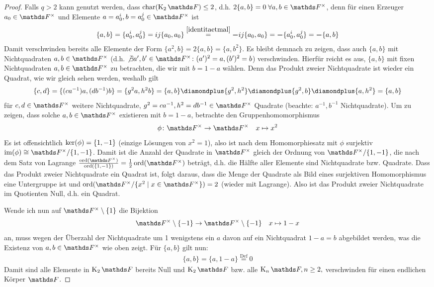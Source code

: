 \documentclass[ngerman,fontsize=11pt, paper=a4, parskip=half, titlepage=true, toc=bib]{scrartcl}
\begin{document}
\begin{Lem}
\begin{proof}
    Falls $q>2$ kann genutzt werden, dass $\Char(\K_2\F)\leq 2$, 
    d.h. $2\{a,b\}=0\;\forall a,b\in\Fx$,
    denn für einen Erzeuger $a_0\in\Fx$ und
    Elemente $a=a_0^i,b=a_0^j\in \Fx$ ist
    \begin{gather*}
      \{a,b\} = \{a_0^i,a_0^j\} = ij\{a_0,a_0\} 
      \overset{\ref{identitaetmal}}{=} \boldsymbol - ij\{a_0,a_0\}
      = \boldsymbol - \{a_0^i,a_0^j\} = \boldsymbol -\{a,b\} 
    \end{gather*}
    Damit verschwinden bereits alle Elemente der Form 
    $\{a^2,b\}=2\{a,b\}=\{a,b^2\}$. Es bleibt demnach zu zeigen, dass
    auch $\{a,b\}$ mit Nichtquadraten $a,b\in\Fx$
    (d.h. $\not\exists a',b'\in\Fx\colon (a')^2=a,(b')^2=b$)
    verschwinden.
    Hierfür reicht es aus, $\{a,b\}$ mit fixen Nichtquadraten
    $a,b\in\Fx$ zu betrachten, die wir mit $b=1-a$ wählen.
    Denn das Produkt zweier Nichtquadrate ist wieder ein Quadrat,
    wie wir gleich sehen werden, weshalb gilt
    \begin{gather*}
      \{c,d\}=\{(ca^{-1})a,(db^{-1})b\}=\{g^2a,h^2b\}
      =\{a,b\}\p\{g^2,h^2\}\p\{g^2,b\}\p\{a,h^2\}
      =\{a,b\}
    \end{gather*}
    für $c,d\in\Fx$ weitere Nichtquadrate, $g^2=ca^{-1},h^2=db^{-1}\in\Fx$
    Quadrate (beachte: $a^{-1},b^{-1}$ Nichtquadrate).
    Um zu zeigen, dass solche $a,b\in\Fx$ existieren mit
    $b=1-a$, betrachte den Gruppenhomomorphismus
    \begin{align*}
      \phi\colon\Fx&\to \Fx
      &x\mapsto x^2
    \end{align*}
    Es ist offensichtlich $\operatorname{ker}(\phi)=\{1,-1\}$ (einzige Lösungen von
    $x^2=1$), also ist nach dem Homomorphiesatz mit $\phi$ surjektiv
    $\im(\phi)\cong \Fx/\{1,-1\}$. Damit ist die Anzahl der Quadrate
    in $\Fx$ gleich der Ordnung von $\Fx/\{1,-1\}$, die nach dem Satz
    von Lagrange
    $\frac{\Ord(\Fx)}{\Ord(\{1,-1\})}=\frac{1}{2}\Ord(\Fx)$
    beträgt, d.h. die
    Hälfte aller Elemente sind Nichtquadrate bzw. Quadrate.
    Dass das Produkt zweier Nichtquadrate ein Quadrat ist, 
    folgt daraus, dass  die Menge der Quadrate als Bild eines surjektiven
    Homomorphismus eine Untergruppe ist und $\Ord(\Fx/\{x^2\mid
    x\in\Fx\})=2$ (wieder mit Lagrange). Also ist das Produkt zweier
    Nichtquadrate im Quotienten Null, d.h. ein Quadrat.

    Wende ich nun auf $\Fx\setminus\{1\}$ die Bijektion
    \begin{align*}
      \Fx\setminus\{-1\}&\to \Fx\setminus\{-1\}
      &x\mapsto 1-x
    \end{align*}
    an, muss wegen der Überzahl der Nichtquadrate um 1 wenigstens ein
    $a$ davon auf ein Nichtquadrat $1-a=b$ abgebildet werden, was die Existenz
    von $a,b\in\Fx$ wie oben zeigt.
    Für $\{a,b\}$ gilt nun:
    \begin{gather*}
      \{a,b\}=\{a,1-a\} \overset{\text{Def}}{=} 0
    \end{gather*}
    Damit sind alle Elemente in $\K_2\F$ bereits Null und $\K_2\F$
    bzw. alle $\K_n\F,n\geq 2,$ verschwinden für einen endlichen
    Körper $\F$.
  \end{proof}
\end{Lem}
\end{document}
